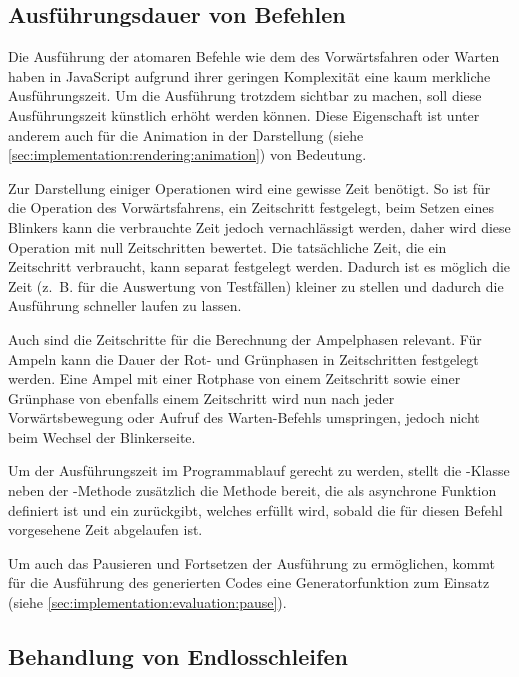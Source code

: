\subsection{Ausführungsdauer von Befehlen}
\label{sec:implementation:evaluation:execution-time}

Die Ausführung der atomaren Befehle wie dem des Vorwärtsfahren oder Warten haben in JavaScript aufgrund ihrer geringen Komplexität eine kaum merkliche Ausführungszeit. Um die Ausführung trotzdem sichtbar zu machen, soll diese Ausführungszeit künstlich erhöht werden können. Diese Eigenschaft ist unter anderem auch für die Animation in der Darstellung (siehe \ref{sec:implementation:rendering:animation}) von Bedeutung.

Zur Darstellung einiger Operationen wird eine gewisse Zeit benötigt. So ist für die Operation des Vorwärtsfahrens, ein Zeitschritt festgelegt, beim Setzen eines Blinkers kann die verbrauchte Zeit jedoch vernachlässigt werden, daher wird diese Operation mit null Zeitschritten bewertet. Die tatsächliche Zeit, die ein Zeitschritt verbraucht, kann separat festgelegt werden. Dadurch ist es möglich die Zeit (z.~B. für die Auswertung von Testfällen) kleiner zu stellen und dadurch die Ausführung schneller laufen zu lassen.

Auch sind die Zeitschritte für die Berechnung der Ampelphasen relevant. Für Ampeln kann die Dauer der Rot- und Grünphasen in Zeitschritten festgelegt werden. Eine Ampel mit einer Rotphase von einem Zeitschritt sowie einer Grünphase von ebenfalls einem Zeitschritt wird nun nach jeder Vorwärtsbewegung oder Aufruf des Warten-Be\-fehls umspringen, jedoch nicht beim Wechsel der Blinkerseite.

Um der Ausführungszeit im Programmablauf gerecht zu werden, stellt die -Klas\-se neben der -Methode zusätzlich die Methode  bereit, die als asynchrone Funktion definiert ist und ein  zurückgibt, welches erfüllt wird, sobald die für diesen Befehl vorgesehene Zeit abgelaufen ist.

Um auch das Pausieren und Fortsetzen der Ausführung zu ermöglichen, kommt für die Ausführung des generierten Codes eine Generatorfunktion zum Einsatz (siehe \ref{sec:implementation:evaluation:pause}).

\subsection{Behandlung von Endlosschleifen}
\label{sec:implementation:evaluation:infinite-loop}

